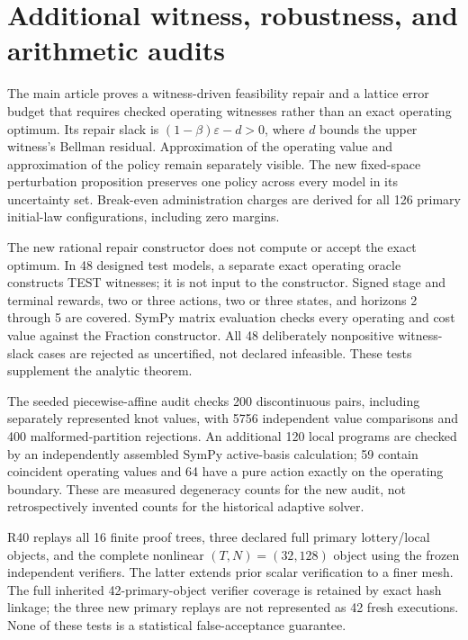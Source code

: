 \section{Additional witness, robustness, and arithmetic audits}
The main article proves a witness-driven feasibility repair and a lattice error budget that requires checked operating witnesses rather than an exact operating optimum. Its repair slack is $(1-\beta)\varepsilon-d>0$, where $d$ bounds the upper witness's Bellman residual. Approximation of the operating value and approximation of the policy remain separately visible. The new fixed-space perturbation proposition preserves one policy across every model in its uncertainty set. Break-even administration charges are derived for all 126 primary initial-law configurations, including zero margins.

The new rational repair constructor does not compute or accept the exact optimum. In 48 designed test models, a separate exact operating oracle constructs TEST witnesses; it is not input to the constructor. Signed stage and terminal rewards, two or three actions, two or three states, and horizons 2 through 5 are covered. SymPy matrix evaluation checks every operating and cost value against the Fraction constructor. All 48 deliberately nonpositive witness-slack cases are rejected as uncertified, not declared infeasible. These tests supplement the analytic theorem.

The seeded piecewise-affine audit checks 200 discontinuous pairs, including separately represented knot values, with 5756 independent value comparisons and 400 malformed-partition rejections. An additional 120 local programs are checked by an independently assembled SymPy active-basis calculation; 59 contain coincident operating values and 64 have a pure action exactly on the operating boundary. These are measured degeneracy counts for the new audit, not retrospectively invented counts for the historical adaptive solver.

R40 replays all 16 finite proof trees, three declared full primary lottery/local objects, and the complete nonlinear $(T,N)=(32,128)$ object using the frozen independent verifiers. The latter extends prior scalar verification to a finer mesh. The full inherited 42-primary-object verifier coverage is retained by exact hash linkage; the three new primary replays are not represented as 42 fresh executions. None of these tests is a statistical false-acceptance guarantee.

